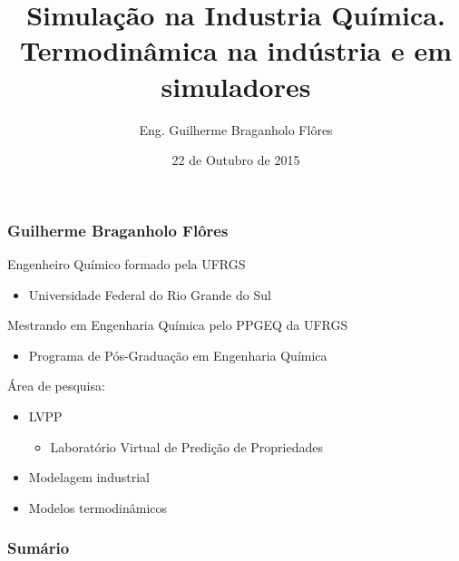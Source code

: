 \documentclass[aspectratio=169]{beamer}
\title[Simulação na Industria Química]{Simulação na Industria Química.\\
Termodinâmica na indústria e em simuladores }
\author{Eng. Guilherme Braganholo Flôres} %
\institute[PPGEQ - UFRGS] %
{
UNIVERSIDADE FEDERAL DO RIO GRANDE DO SUL \\
ESCOLA DE ENGENHARIA \\
DEPARTAMENTO DE ENGENHARIA QUÍMICA \\
LAB. VIRTUAL DE PREDIÇÃO DE PROPRIEDADE \\ %
\medskip
\textit{gbflores89@gmail.com} %
}
\date{22 de Outubro de 2015} %
\begin{document}
\begin{frame}
\titlepage %
\end{frame}

\begin{frame}
	\frametitle{Guilherme Braganholo Flôres}
	Engenheiro Químico formado pela UFRGS
	\begin{itemize} 
		\item Universidade Federal do Rio Grande do Sul
	\end{itemize}

	Mestrando em Engenharia Química pelo PPGEQ da UFRGS
	\begin{itemize}
		\item Programa de Pós-Graduação em Engenharia Química
	\end{itemize}
 	\pause
	Área de pesquisa:
	\begin{itemize}
		\item LVPP
		\begin{itemize}
			\item Laboratório Virtual de Predição de Propriedades
		\end{itemize}
	\item Modelagem industrial 
	\item Modelos termodinâmicos
	\end{itemize}
\end{frame}


\begin{frame}
\frametitle{Sumário} %
\tableofcontents %
\end{frame}

\end{document}
